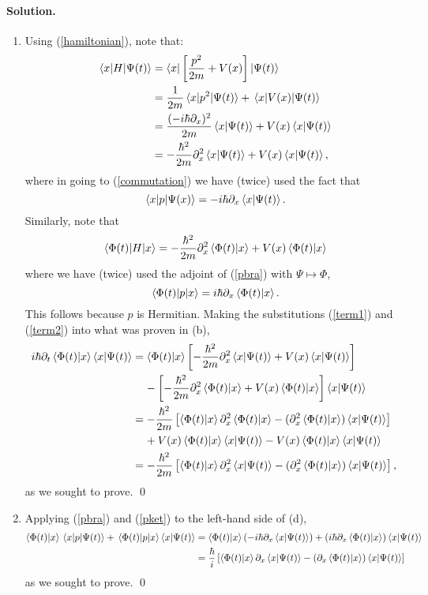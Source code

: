 \documentclass[10pt]{article}
\newcommand{\refeq}[1]{(\ref{#1})}
\newenvironment{solution}
{
    \paragraph{Solution.}
    \ignorespaces
}
{
    \bigskip
}
\begin{document}
\begin{solution}
\begin{enumerate}
		\item Using \refeq{hamiltonian}, note that:
			\begin{align}
				\mel{x}{H}{\Psi(t)} &= \bra{x} \left[ \frac{p^2}{2m} + V(x) \right] \ket{\Psi(t)} \\
				&= \frac{1}{2m} \mel{x}{p^2}{\Psi(t)} + \mel{x}{V(x)}{\Psi(t)} \\
				&= \frac{(-i \hbar \partial_x)^2}{2m} \braket{x}{\Psi(t)} + V(x) \braket{x}{\Psi(t)} \label{commutation} \\
				&= -\frac{\hbar^2}{2m} \partial_x^2 \braket{x}{\Psi(t)} + V(x) \braket{x}{\Psi(t)}, \label{term1}
			\end{align}
			where in going to \refeq{commutation} we have (twice) used the fact that
			\begin{equation} \label{pbra}
				\mel{x}{p}{\Psi(x)} = -i \hbar \partial_x \braket{x}{\Psi(t)}.
			\end{equation}
			Similarly, note that
			\begin{equation} \label{term2}
				\mel{\Phi(t)}{H}{x} = -\frac{\hbar^2}{2m} \partial_x^2 \braket{\Phi(t)}{x} + V(x) \braket{\Phi(t)}{x}
			\end{equation}
			where we have (twice) used the adjoint of \refeq{pbra} with $\Psi \mapsto \Phi$,
			\begin{equation} \label{pket}
				 \mel{\Phi(t)}{p}{x} = i \hbar \partial_x \braket{\Phi(t)}{x}.
			\end{equation}
			This follows because $p$ is Hermitian.  Making the substitutions \refeq{term1} and \refeq{term2} into what was proven in (b),
			\begin{align}
				i \hbar \partial_t \braket{\Phi(t)}{x} \braket{x}{\Psi(t)} &= \braket{\Phi(t)}{x} \left[ -\frac{\hbar^2}{2m} \partial_x^2 \braket{x}{\Psi(t)} + V(x) \braket{x}{\Psi(t)} \right] \notag \\
    				&\phantom{=\ } - \left[ -\frac{\hbar^2}{2m} \partial_x^2 \braket{\Phi(t)}{x} + V(x) \braket{\Phi(t)}{x} \right] \braket{x}{\Psi(t)} \\
				&= -\frac{\hbar^2}{2m} \left[ \braket{\Phi(t)}{x} \partial_x^2 \braket{\Phi(t)}{x} - (\partial_x^2 \braket{\Phi(t)}{x}) \braket{x}{\Psi(t)} \right] \notag \\
				&\phantom{=\ } + V(x) \braket{\Phi(t)}{x} \braket{x}{\Psi(t)} - V(x) \braket{\Phi(t)}{x} \braket{x}{\Psi(t)} \\
				&= -\dfrac{\hbar^2}{2m} \left[ \braket{\Phi(t)}{x} \partial_x^2 \braket{x}{\Psi(t)} - (\partial_x^2 \braket{\Phi(t)}{x}) \braket{x}{\Psi(t)} \right],
			\end{align}
			as we sought to prove. \qed
			
		\item Applying \refeq{pbra} and \refeq{pket} to the left-hand side of (d),
			\begin{align}
				\braket{\Phi(t)}{x} \mel{x}{p}{\Psi(t)} + \mel{\Phi(t)}{p}{x} \braket{x}{\Psi(t)} &= \braket{\Phi(t)}{x} (-i \hbar \partial_x \braket{x}{\Psi(t)}) + (i \hbar \partial_x \braket{\Phi(t)}{x}) \braket{x}{\Psi(t)} \\
				&= \dfrac{\hbar}{i} \left[ \braket{\Phi(t)}{x} \partial_x \braket{x}{\Psi(t)} - (\partial_x \braket{\Phi(t)}{x}) \braket{x}{\Psi(t)} \right]
			\end{align}
			as we sought to prove. \qed
			

\end{enumerate}
\end{solution}
\end{document}
